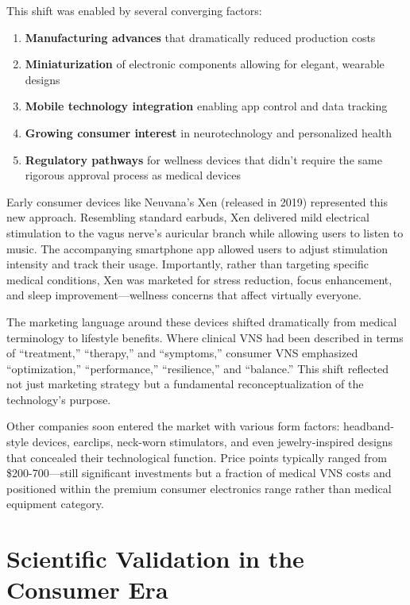 \documentclass[
  Letterpaper,
]{scrbook}
\providecommand{\tightlist}{%
  \setlength{\itemsep}{0pt}\setlength{\parskip}{0pt}}\usepackage{longtable,booktabs,array}
\begin{document}
This shift was enabled by several converging factors:

\begin{enumerate}
\def\labelenumi{\arabic{enumi}.}
\tightlist
\item
  \textbf{Manufacturing advances} that dramatically reduced production
  costs
\item
  \textbf{Miniaturization} of electronic components allowing for
  elegant, wearable designs
\item
  \textbf{Mobile technology integration} enabling app control and data
  tracking
\item
  \textbf{Growing consumer interest} in neurotechnology and personalized
  health
\item
  \textbf{Regulatory pathways} for wellness devices that didn't require
  the same rigorous approval process as medical devices
\end{enumerate}

Early consumer devices like Neuvana's Xen (released in 2019) represented
this new approach. Resembling standard earbuds, Xen delivered mild
electrical stimulation to the vagus nerve's auricular branch while
allowing users to listen to music. The accompanying smartphone app
allowed users to adjust stimulation intensity and track their usage.
Importantly, rather than targeting specific medical conditions, Xen was
marketed for stress reduction, focus enhancement, and sleep
improvement---wellness concerns that affect virtually everyone.

The marketing language around these devices shifted dramatically from
medical terminology to lifestyle benefits. Where clinical VNS had been
described in terms of ``treatment,'' ``therapy,'' and ``symptoms,''
consumer VNS emphasized ``optimization,'' ``performance,''
``resilience,'' and ``balance.'' This shift reflected not just marketing
strategy but a fundamental reconceptualization of the technology's
purpose.

Other companies soon entered the market with various form factors:
headband-style devices, earclips, neck-worn stimulators, and even
jewelry-inspired designs that concealed their technological function.
Price points typically ranged from \$200-700---still significant
investments but a fraction of medical VNS costs and positioned within
the premium consumer electronics range rather than medical equipment
category.

\section{Scientific Validation in the Consumer
Era}\label{scientific-validation-in-the-consumer-era}
\end{document}
